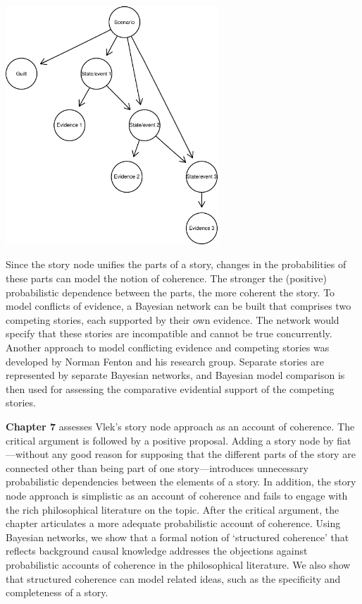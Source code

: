 \documentclass[
  10pt,
  dvipsnames,enabledeprecatedfontcommands]{scrartcl}
\begin{document}
\vspace{-2mm}

\begin{center}
\includegraphics[width=8cm]{vlek-scenario-node.pdf}
 \end{center}

\vspace{-2mm}

\noindent Since the story node unifies the parts of a story, changes in
the probabilities of these parts can model the notion of coherence. The
stronger the (positive) probabilistic dependence between the parts, the
more coherent the story. To model conflicts of evidence, a Bayesian
network can be built that comprises two competing stories, each
supported by their own evidence. The network would specify that these
stories are incompatible and cannot be true concurrently. Another
approach to model conflicting evidence and competing stories was
developed by Norman Fenton and his research group. Separate stories are
represented by separate Bayesian networks, and Bayesian model comparison
is then used for assessing the comparative evidential support of the
competing stories.

\textbf{Chapter 7} assesses Vlek's story node approach as an account of
coherence. The critical argument is followed by a positive proposal.
Adding a story node by fiat---without any good reason for supposing that
the different parts of the story are connected other than being part of
one story---introduces unnecessary probabilistic dependencies between
the elements of a story. In addition, the story node approach is
simplistic as an account of coherence and fails to engage with the rich
philosophical literature on the topic. After the critical argument, the
chapter articulates a more adequate probabilistic account of coherence.
Using Bayesian networks, we show that a formal notion of `structured
coherence' that reflects background causal knowledge addresses the
objections against probabilistic accounts of coherence in the
philosophical literature. We also show that structured coherence can
model related ideas, such as the specificity and completeness of a
story.
\end{document}
